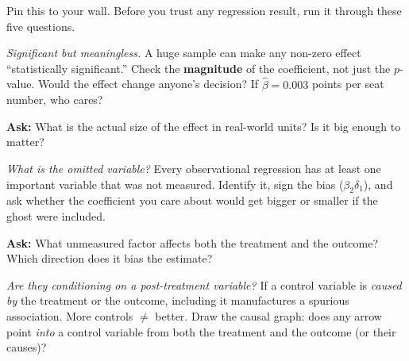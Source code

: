 \documentclass[11pt,a4paper]{article}
\theoremstyle{definition}
\theoremstyle{plain}
\theoremstyle{remark}
\newcommand{\bhat}{\hat{\beta}}
\begin{document}
\begin{tcolorbox}[colback=biasred!5, colframe=biasred!80!black, fonttitle=\bfseries\large,
  title={\centering Statistical BS Detector}, breakable,
  boxrule=1.5pt, arc=4pt, top=8pt, bottom=8pt]

Pin this to your wall. Before you trust any regression result, run it through these five questions.

\bigskip

\begin{tcolorbox}[colback=truthgold!10, colframe=truthgold!80!black, fonttitle=\bfseries,
  title={1.\quad ``Is this a seat number?''}, boxrule=0.8pt]
\emph{Significant but meaningless.}
A huge sample can make any non-zero effect ``statistically significant.'' Check the \textbf{magnitude} of the coefficient, not just the $p$-value. Would the effect change anyone's decision? If $\bhat = 0.003$ points per seat number, who cares?

\smallskip
\textbf{Ask:} What is the actual size of the effect in real-world units? Is it big enough to matter?
\end{tcolorbox}

\medskip

\begin{tcolorbox}[colback=truthgold!10, colframe=truthgold!80!black, fonttitle=\bfseries,
  title={2.\quad ``Where's the ghost?''}, boxrule=0.8pt]
\emph{What is the omitted variable?}
Every observational regression has at least one important variable that was not measured. Identify it, sign the bias ($\beta_2 \delta_1$), and ask whether the coefficient you care about would get bigger or smaller if the ghost were included.

\smallskip
\textbf{Ask:} What unmeasured factor affects both the treatment and the outcome? Which direction does it bias the estimate?
\end{tcolorbox}

\medskip

\begin{tcolorbox}[colback=truthgold!10, colframe=truthgold!80!black, fonttitle=\bfseries,
  title={3.\quad ``Is this a collider?''}, boxrule=0.8pt]
\emph{Are they conditioning on a post-treatment variable?}
If a control variable is \emph{caused by} the treatment or the outcome, including it manufactures a spurious association. More controls $\neq$ better. Draw the causal graph: does any arrow point \emph{into} a control variable from both the treatment and the outcome (or their causes)?


\end{tcolorbox}
\end{tcolorbox}
\end{document}
